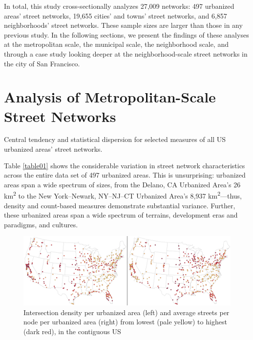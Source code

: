 \documentclass{article}
\begin{document}
In total, this study cross-sectionally analyzes 27,009 networks: 497 urbanized areas' street networks, 19,655 cities' and towns' street networks, and 6,857 neighborhoods' street networks. These sample sizes are larger than those in any previous study. In the following sections, we present the findings of these analyses at the metropolitan scale, the municipal scale, the neighborhood scale, and through a case study looking deeper at the neighborhood-scale street networks in the city of San Francisco.

\section{Analysis of Metropolitan-Scale Street Networks}

\begin{table}[hp]
\caption{Central tendency and statistical dispersion for selected measures of all US urbanized areas' street networks.}
\label{table01}
\end{table}

Table \ref{table01} shows the considerable variation in street network characteristics across the entire data set of 497 urbanized areas. This is unsurprising: urbanized areas span a wide spectrum of sizes, from the Delano, CA Urbanized Area's 26 km\textsuperscript{2} to the New York--Newark, NY--NJ--CT Urbanized Area's 8,937 km\textsuperscript{2}---thus, density and count-based measures demonstrate substantial variance. Further, these urbanized areas span a wide spectrum of terrains, development eras and paradigms, and cultures.

\begin{figure}[h]
\includegraphics[width=1\textwidth]{media/fig01.png}
\caption{Intersection density per urbanized area (left) and average streets per node per urbanized area (right) from lowest (pale yellow) to highest (dark red), in the contiguous US}
\label{fig01}
\end{figure}
\end{document}
